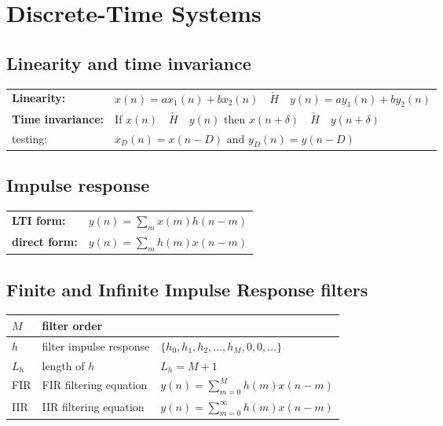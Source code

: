 \section{Discrete-Time Systems}
\subsection{Linearity and time invariance}
\begin{tabular}{ll}
\textbf{Linearity:} & $x(n) = ax_1(n) + bx_2(n) \quad \underrightarrow{H} \quad y(n) = ay_1(n) + by_2(n)$\\
\textbf{Time invariance:} & If $x(n) \quad \underrightarrow{H} \quad y(n)$ then $x(n+\delta) \quad \underrightarrow{H} \quad y(n+\delta)$\\
testing: & $x_D(n)=x(n-D)$ and $y_D(n)=y(n-D)$\\
\end{tabular}

\subsection{Impulse response}
\begin{tabular}{ll}
	\textbf{LTI form:}		& $y(n) = \sum\limits_m x(m)h(n-m)$ \\
	\textbf{direct form:}	& $y(n) = \sum\limits_m h(m)x(n-m)$
\end{tabular}


\subsection{Finite and Infinite Impulse Response filters}
\begin{tabularx}{0.75\textwidth}{|l|X|X|}
	\hline
	$M$	& filter order				& 
	\\ \hline
	$h$	& filter impulse response	& $\{ h_0, h_1, h_2, \ldots , h_M, 0, 0, \ldots\}$
	\\ \hline
	$L_h$	& length of $h$			& $L_h = M + 1$
	\\ \hline
	FIR		& FIR filtering equation	& $y(n) = \sum\limits_{m=0}^{M} h(m)x(n-m)$
	\\ \hline
	IIR		& IIR filtering equation	& $y(n) = \sum\limits_{m=0}^{\infty} h(m)x(n-m)$
	\\ \hline
\end{tabularx}

\newpage

